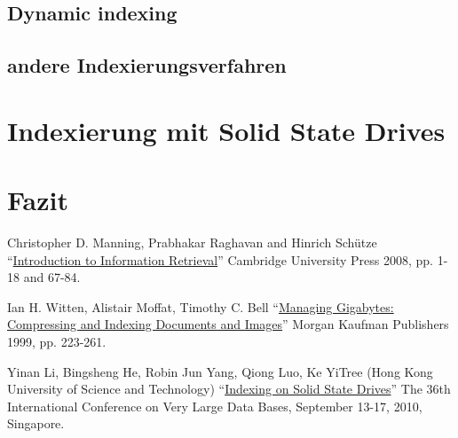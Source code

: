 \subsection{Dynamic indexing}
\subsection{andere Indexierungsverfahren}



\section{Indexierung mit Solid State Drives} \label{indexSSD}

\section{Fazit}

\begin{thebibliography}{9}

		Christopher D. Manning, Prabhakar Raghavan and Hinrich Schütze \enquote{\href{https://nlp.stanford.edu/IR-book/pdf/04const.pdf}{Introduction to Information Retrieval}}  Cambridge University Press 2008, pp. 1-18 and 67-84.

	  Ian H. Witten, Alistair Moffat, Timothy C. Bell \enquote{\href{https://books.google.de/books?id=2F74jyPl48EC&dq=Witten+et+al.+index+1999&lr=&hl=de&source=gbs_navlinks_s}{Managing Gigabytes: Compressing and Indexing Documents and Images}}  Morgan Kaufman Publishers 1999, pp. 223-261.
	
	Yinan Li, Bingsheng He, Robin Jun Yang, Qiong Luo, Ke YiTree (Hong Kong University of Science and Technology) \enquote{\href{http://pages.cs.wisc.edu/~yinan/paper/fdtree_pvldb.pdf}{Indexing on Solid State Drives}} The 36th International Conference on Very Large Data Bases, September 13-17,
2010, Singapore.
\end{thebibliography}
